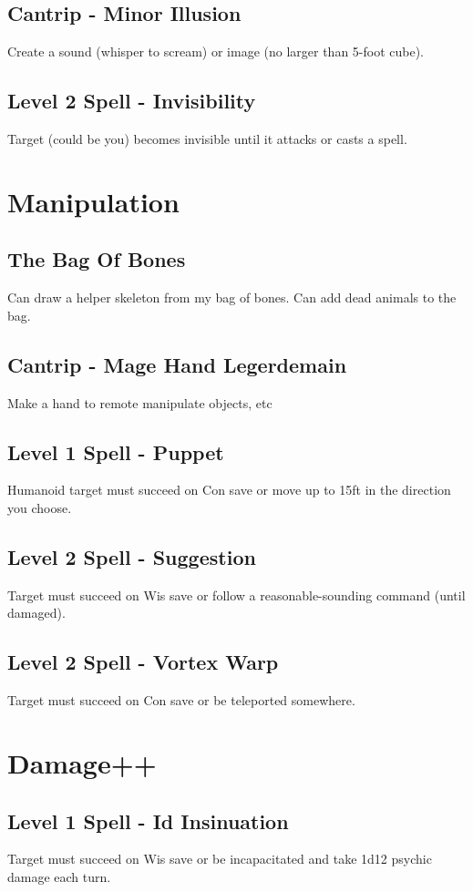 \documentclass{article}
\begin{document}
\subsection{Cantrip - Minor Illusion}
Create a sound (whisper to scream) or image (no larger than 5-foot cube).

\subsection{Level 2 Spell - Invisibility}
Target (could be you) becomes invisible until it attacks or casts a spell.

\section{Manipulation}
\subsection{The Bag Of Bones}
Can draw a helper skeleton from my bag of bones. Can add dead animals to the bag.

\subsection{Cantrip - Mage Hand Legerdemain}
Make a hand to remote manipulate objects, etc

\subsection{Level 1 Spell - Puppet}
Humanoid target must succeed on Con save or move up to 15ft in the direction you choose.

\subsection{Level 2 Spell - Suggestion}
Target must succeed on Wis save or follow a reasonable-sounding command (until damaged).

\subsection{Level 2 Spell - Vortex Warp}
Target must succeed on Con save or be teleported somewhere.

\section{Damage++}
\subsection{Level 1 Spell - Id Insinuation}
Target must succeed on Wis save or be incapacitated and take 1d12 psychic damage each turn.
\end{document}
